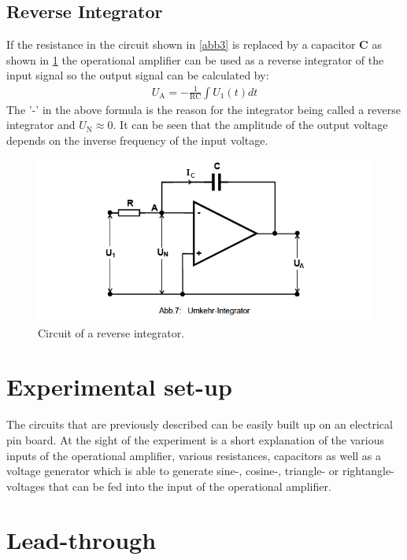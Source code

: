 \subsection{Reverse Integrator}
If the resistance in the circuit shown in \ref{abb3} is replaced by a capacitor \textbf{C}
as shown in \ref{abb5} the operational amplifier can be used as a reverse integrator
of the input signal so the output signal can be calculated by:
\begin{align*}
    U_{\text{A}} = -\frac{1}{\text{RC}} \int U_1(t) dt
\end{align*}
The '-' in the above formula is the reason for the integrator being called a reverse
integrator and $U_{\text{N}} \approx 0$.
It can be seen that the amplitude of the output voltage depends on the inverse frequency
of the input voltage.
\FloatBarrier
\begin{figure}
  \centering
  \includegraphics[scale=0.5]{integrator.PNG}
  \caption{Circuit of a reverse integrator. \cite{Q1}}
  \label{abb5}
\end{figure}
\FloatBarrier

\section{Experimental set-up}
The circuits that are previously described can be easily built up on an electrical
pin board. At the sight of the experiment is a short explanation of the various inputs
of the operational amplifier, various resistances, capacitors as well as a voltage generator which is able to
generate sine-, cosine-, triangle- or rightangle- voltages that can be fed into the
input of the operational amplifier.

\section{Lead-through}

